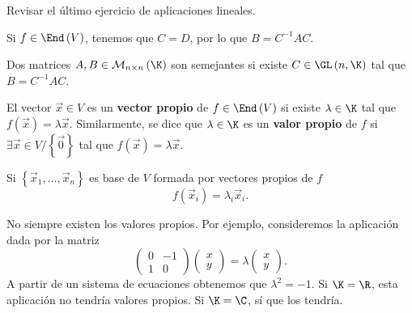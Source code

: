 \begin{observation}
\normalfont Revisar el último ejercicio de aplicaciones lineales.
\end{observation}

\begin{observation}
\normalfont Si $\displaystyle f \in \End\left(V\right) $, tenemos que $\displaystyle C = D $, por lo que $\displaystyle B = C^{-1}AC $.
\end{observation}

\begin{fdefinition}[]
\normalfont Dos matrices $\displaystyle A, B \in \mathcal{M}_{n \times n}\left(\K\right) $ son semejantes si existe $\displaystyle C \in \GL\left(n, \K\right) $ tal que $\displaystyle B = C^{-1}AC $.
\end{fdefinition}

\begin{fdefinition}[]
	\normalfont El vector $\displaystyle \vec{x} \in V $ es un \textbf{vector propio} de $\displaystyle f \in \End\left(V\right) $ si existe $\displaystyle \lambda \in \K $ tal que $\displaystyle f\left(\vec{x}\right) = \lambda \vec{x} $. Similarmente, se dice que $\displaystyle \lambda \in \K $ es un \textbf{valor propio} de $\displaystyle f $ si $\displaystyle \exists \vec{x} \in V/ \left\{ \vec{0}\right\}  $ tal que $\displaystyle f\left(\vec{x}\right) = \lambda \vec{x} $.
\end{fdefinition}

Si $\displaystyle \left\{ \vec{x}_{1}, \ldots, \vec{x}_{n}\right\}  $ es base de $\displaystyle V $ formada por vectores propios de $\displaystyle f $
\[f\left(\vec{x}_{i}\right) = \lambda_{i}\vec{x}_{i} .\]

\begin{eg}
\normalfont No siempre existen los valores propios. Por ejemplo, consideremos la aplicación dada por la matriz
\[\begin{pmatrix} 0 & -1 \\ 1 & 0 \end{pmatrix}\begin{pmatrix} x \\ y \end{pmatrix}  = \lambda\begin{pmatrix} x \\ y \end{pmatrix}.\]
A partir de un sistema de ecuaciones obtenemos que $\displaystyle \lambda^{2} = -1 $. Si $\displaystyle \K = \R $, esta aplicación no tendría valores propios. Si $\displaystyle \K = \C $, sí que los tendría.
\end{eg}

